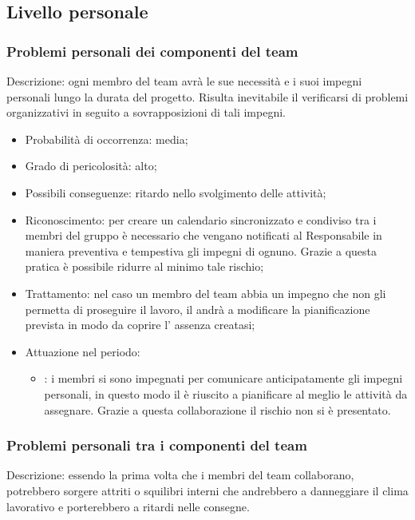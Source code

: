 \documentclass[PianoDiProgetto.tex]{subfiles}
\begin{document}
	\subsection{Livello personale}
		\subsubsection{Problemi personali dei componenti del team}
Descrizione: ogni membro del team avrà le sue necessità e i suoi impegni personali lungo la durata del progetto. Risulta inevitabile il verificarsi di problemi organizzativi in seguito a sovrapposizioni di tali impegni.

	\begin{itemize}
		\item Probabilità di occorrenza: media;
		\item Grado di pericolosità: alto;
		\item Possibili conseguenze: ritardo nello svolgimento delle attività;
		\item Riconoscimento: per creare un calendario sincronizzato e condiviso tra i membri del gruppo è necessario che vengano notificati al Responsabile in maniera preventiva e tempestiva gli impegni di ognuno. Grazie a questa pratica è possibile ridurre al minimo tale rischio;
		\item Trattamento: nel caso un membro del team abbia un impegno che non gli permetta di proseguire il lavoro, il \RESP{} andrà a modificare la pianificazione prevista in modo da coprire l' assenza creatasi;
		\item Attuazione nel periodo: 
			\begin{itemize}
				\item \ARdoc : i membri si sono impegnati per comunicare anticipatamente gli impegni personali, in questo modo il \RESP{} è riuscito a pianificare al meglio le attività da assegnare. Grazie a questa collaborazione il rischio non si è presentato.
			\end{itemize}
	\end{itemize}
		\subsubsection{Problemi personali tra i componenti del team}
Descrizione: essendo la prima volta che i membri del team collaborano, potrebbero sorgere attriti o squilibri interni che andrebbero a danneggiare il clima lavorativo e porterebbero a ritardi nelle consegne.
\end{document}
